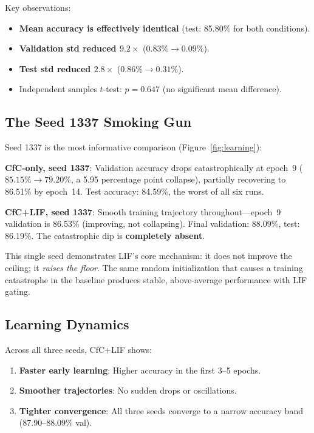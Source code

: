 \documentclass[11pt]{article}
\begin{document}
Key observations:
\begin{itemize}
    \item \textbf{Mean accuracy is effectively identical} (test: 85.80\% for both conditions).
    \item \textbf{Validation std reduced $9.2\times$} ($0.83\% \to 0.09\%$).
    \item \textbf{Test std reduced $2.8\times$} ($0.86\% \to 0.31\%$).
    \item Independent samples $t$-test: $p = 0.647$ (no significant mean difference).
\end{itemize}

\subsection{The Seed 1337 Smoking Gun}

Seed 1337 is the most informative comparison (Figure~\ref{fig:learning}):

\textbf{CfC-only, seed 1337}: Validation accuracy drops catastrophically at epoch~9 ($85.15\% \to 79.20\%$, a 5.95 percentage point collapse), partially recovering to 86.51\% by epoch~14. Test accuracy: 84.59\%, the worst of all six runs.

\textbf{CfC+LIF, seed 1337}: Smooth training trajectory throughout---epoch~9 validation is 86.53\% (improving, not collapsing). Final validation: 88.09\%, test: 86.19\%. The catastrophic dip is \textbf{completely absent}.

This single seed demonstrates LIF's core mechanism: it does not improve the ceiling; it \emph{raises the floor}. The same random initialization that causes a training catastrophe in the baseline produces stable, above-average performance with LIF gating.

\subsection{Learning Dynamics}

Across all three seeds, CfC+LIF shows:
\begin{enumerate}
    \item \textbf{Faster early learning}: Higher accuracy in the first 3--5 epochs.
    \item \textbf{Smoother trajectories}: No sudden drops or oscillations.
    \item \textbf{Tighter convergence}: All three seeds converge to a narrow accuracy band (87.90--88.09\% val).
\end{enumerate}
\end{document}
